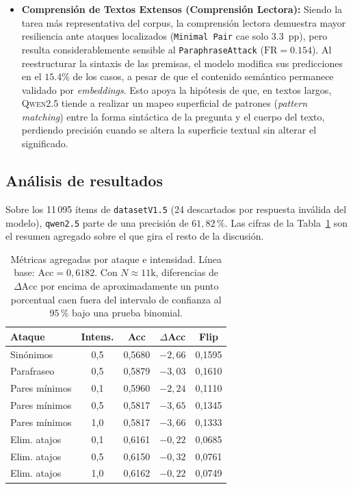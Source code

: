 \documentclass[11pt]{article}
\begin{document}
\begin{itemize}
    \item \textbf{Comprensión de Textos Extensos (Comprensión Lectora):}
    Siendo la tarea más representativa del corpus, la comprensión lectora
    demuestra mayor resiliencia ante ataques localizados (\texttt{Minimal Pair}
    cae solo $3.3$~pp), pero resulta considerablemente sensible al
    \texttt{ParaphraseAttack} ($\text{FR} = 0.154$). Al reestructurar la sintaxis
    de las premisas, el modelo modifica sus predicciones en el $15.4\%$ de los
    casos, a pesar de que el contenido semántico permanece validado por \textit{embeddings}.
    Esto apoya la hipótesis de que, en textos largos, \textsc{Qwen2.5} tiende a
    realizar un mapeo superficial de patrones (\textit{pattern matching}) entre la
    forma sintáctica de la pregunta y el cuerpo del texto, perdiendo precisión
    cuando se altera la superficie textual sin alterar el significado.
\end{itemize}

\subsection{Análisis de resultados}
\label{sec:results-analysis}

Sobre los 11\,095 ítems de \texttt{datasetV1.5} (24 descartados por
respuesta inválida del modelo), \texttt{qwen2.5} parte de una precisión
de $61{,}82\,\%$. Las cifras de la Tabla~\ref{tab:results-summary} son
el resumen agregado sobre el que gira el resto de la discusión.

\begin{table}[h]
\centering
\small
\begin{tabular}{lcccc}
\hline
\textbf{Ataque} & \textbf{Intens.} & \textbf{Acc} & $\Delta$\textbf{Acc} & \textbf{Flip} \\
\hline
Sinónimos       & 0{,}5 & 0{,}5680 & $-2{,}66$ & 0{,}1595 \\
Parafraseo      & 0{,}5 & 0{,}5879 & $-3{,}03$ & 0{,}1610 \\
Pares mínimos   & 0{,}1 & 0{,}5960 & $-2{,}24$ & 0{,}1110 \\
Pares mínimos   & 0{,}5 & 0{,}5817 & $-3{,}65$ & 0{,}1345 \\
Pares mínimos   & 1{,}0 & 0{,}5817 & $-3{,}66$ & 0{,}1333 \\
Elim. atajos    & 0{,}1 & 0{,}6161 & $-0{,}22$ & 0{,}0685 \\
Elim. atajos    & 0{,}5 & 0{,}6150 & $-0{,}32$ & 0{,}0761 \\
Elim. atajos    & 1{,}0 & 0{,}6162 & $-0{,}22$ & 0{,}0749 \\
\hline
\end{tabular}
\caption{Métricas agregadas por ataque e intensidad. Línea base:
$\text{Acc}=0{,}6182$. Con $N \approx 11\text{k}$, diferencias de
$\Delta\text{Acc}$ por encima de aproximadamente un punto porcentual
caen fuera del intervalo de confianza al $95\,\%$ bajo una prueba
binomial.}
\label{tab:results-summary}
\end{table}
\end{document}
